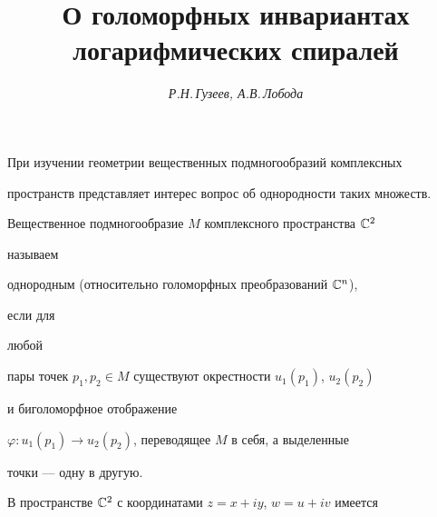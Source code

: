 

\author{\it Р.Н.\,Гузеев, А.В.\,Лобода}  




\title{О голоморфных инвариантах\\ логарифмических спиралей}  


  


\date{}  




  


\pagestyle{plain} %


  


  




  


\maketitle  


 


При изучении геометрии вещественных подмногообразий комплексных 


пространств представляет интерес вопрос об однородности таких множеств. 


 


Вещественное подмногообразие $M$ комплексного пространства $\Bbb C^2$ 


называем 


однородным (относительно голоморфных преобразований $\Bbb C^n$), 


если для 


любой 


пары точек $p_1,p_2\in M$ существуют окрестности $u_1(p_1)$, $u_2(p_2)$ 


и биголоморфное отображение 


$\varphi:u_1(p_1)\to u_2(p_2)$, переводящее $M$ в себя, а выделенные 


точки --- одну в другую. 


 


В пространстве $\Bbb C^2$ с координатами $z=x+iy$, $w=u+iv$ имеется 


